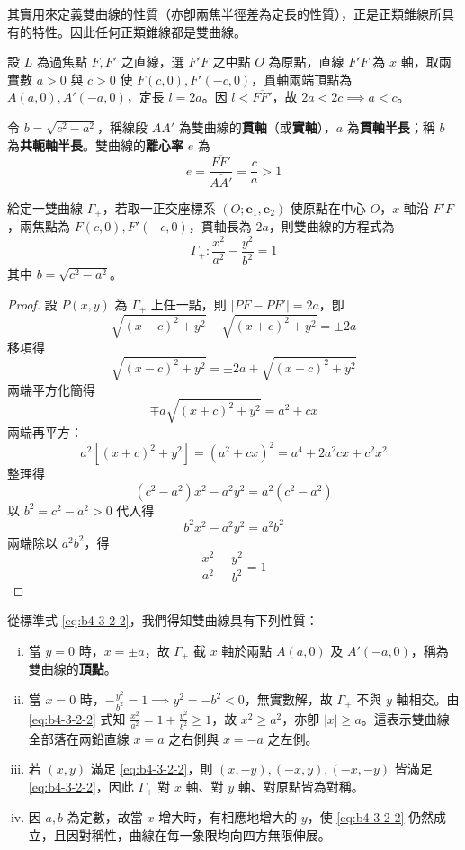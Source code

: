 其實用來定義雙曲線的性質（亦卽兩焦半徑差為定長的性質），正是正類錐線所具有的特性。因此任何正類錐線都是雙曲線。

設 $L$ 為過焦點 $F, F'$ 之直線，選 $F'F$ 之中點 $O$ 為原點，直線 $F'F$ 為 $x$ 軸，取兩實數 $a > 0$ 與 $c > 0$ 使 $F(c,0), F'(-c,0)$，貫軸兩端頂點為 $A(a,0), A'(-a,0)$，定長 $l = 2a$。因 $l < \overline{FF'}$，故 $2a < 2c \implies a < c$。

\begin{definition*}
令 $b = \sqrt{c^2 - a^2}$，稱線段 $AA'$ 為雙曲線的\textbf{貫軸}（或\textbf{實軸}），$a$ 為\textbf{貫軸半長}；稱 $b$ 為\textbf{共軛軸半長}。雙曲線的\textbf{離心率} $e$ 為
\[ e = \frac{\overline{FF'}}{\overline{AA'}} = \frac{c}{a} > 1 \]
\end{definition*}

\begin{proposition}
給定一雙曲線 $\Gamma_+$，若取一正交座標系 $(O; \mathbf{e}_1, \mathbf{e}_2)$ 使原點在中心 $O$，$x$ 軸沿 $F'F$，兩焦點為 $F(c,0), F'(-c,0)$，貫軸長為 $2a$，則雙曲線的方程式為
\begin{equation}
\Gamma_+ : \frac{x^2}{a^2} - \frac{y^2}{b^2} = 1 \label{eq:b4-3-2-2}
\end{equation}
其中 $b = \sqrt{c^2 - a^2}$。
\end{proposition}

\begin{proof}
設 $P(x,y)$ 為 $\Gamma_+$ 上任一點，則 $|PF - PF'| = 2a$，卽
\[ \sqrt{(x-c)^2 + y^2} - \sqrt{(x+c)^2 + y^2} = \pm 2a \]
移項得
\[ \sqrt{(x-c)^2 + y^2} = \pm 2a + \sqrt{(x+c)^2 + y^2} \]
兩端平方化簡得
\[ \mp a\sqrt{(x+c)^2 + y^2} = a^2 + cx \]
兩端再平方：
\[ a^2[(x+c)^2 + y^2] = (a^2 + cx)^2 = a^4 + 2a^2cx + c^2x^2 \]
整理得
\[ (c^2 - a^2)x^2 - a^2y^2 = a^2(c^2 - a^2) \]
以 $b^2 = c^2 - a^2 > 0$ 代入得
\[ b^2x^2 - a^2y^2 = a^2b^2 \]
兩端除以 $a^2b^2$，得
\[ \frac{x^2}{a^2} - \frac{y^2}{b^2} = 1 \]
\end{proof}

從標準式 \eqref{eq:b4-3-2-2}，我們得知雙曲線具有下列性質：
\begin{enumerate}[(i)]
  \item 當 $y=0$ 時，$x = \pm a$，故 $\Gamma_+$ 截 $x$ 軸於兩點 $A(a,0)$ 及 $A'(-a,0)$，稱為雙曲線的\textbf{頂點}。
  \item 當 $x=0$ 時，$-\frac{y^2}{b^2} = 1 \implies y^2 = -b^2 < 0$，無實數解，故 $\Gamma_+$ 不與 $y$ 軸相交。由 \eqref{eq:b4-3-2-2} 式知 $\frac{x^2}{a^2} = 1 + \frac{y^2}{b^2} \ge 1$，故 $x^2 \ge a^2$，亦卽 $|x| \ge a$。這表示雙曲線全部落在兩鉛直線 $x = a$ 之右側與 $x = -a$ 之左側。
  \item 若 $(x,y)$ 滿足 \eqref{eq:b4-3-2-2}，則 $(x,-y), (-x,y), (-x,-y)$ 皆滿足 \eqref{eq:b4-3-2-2}，因此 $\Gamma_+$ 對 $x$ 軸、對 $y$ 軸、對原點皆為對稱。
  \item 因 $a, b$ 為定數，故當 $x$ 增大時，有相應地增大的 $y$，使 \eqref{eq:b4-3-2-2} 仍然成立，且因對稱性，曲線在每一象限均向四方無限伸展。
\end{enumerate}

